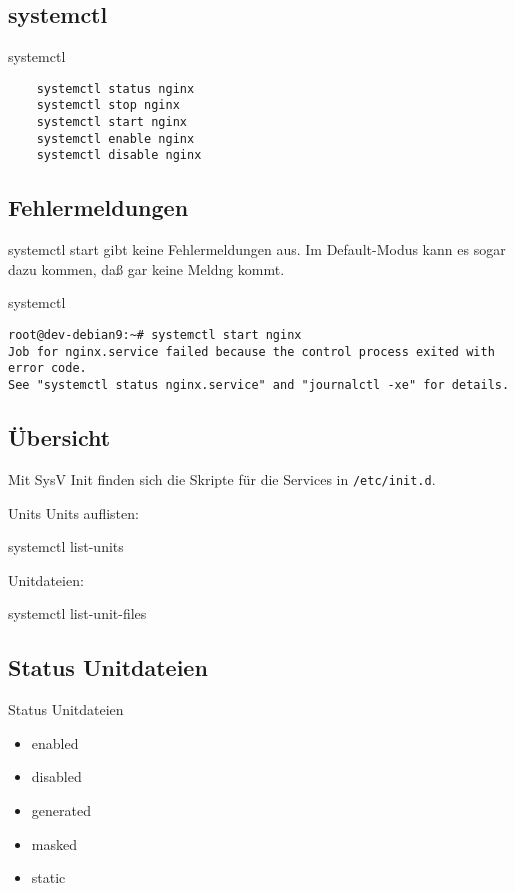 \subsection{systemctl}

\begin{frame}[fragile]{systemctl}
 \begin{lstlisting} 
    systemctl status nginx
    systemctl stop nginx
    systemctl start nginx
    systemctl enable nginx
    systemctl disable nginx
  \end{lstlisting}
\end{frame}

\subsection{Fehlermeldungen}

systemctl start gibt keine Fehlermeldungen aus. Im Default-Modus kann es sogar dazu kommen, daß gar keine Meldng kommt.

\begin{frame}[fragile]{systemctl}
\begin{lstlisting}
root@dev-debian9:~# systemctl start nginx
Job for nginx.service failed because the control process exited with error code.
See "systemctl status nginx.service" and "journalctl -xe" for details.
\end{lstlisting}
\end{frame}

\subsection{Übersicht}

Mit SysV Init finden sich die Skripte für die Services in \verb|/etc/init.d|.

\begin{frame}{Units}
Units auflisten:

    systemctl list-units

Unitdateien:

systemctl list-unit-files
\end{frame}

\subsection{Status Unitdateien}

\begin{frame}[fragile]{Status Unitdateien}
\begin{itemize}
\item enabled
\item disabled
\item generated
\item masked
\item static
\end{itemize}
\end{frame}

